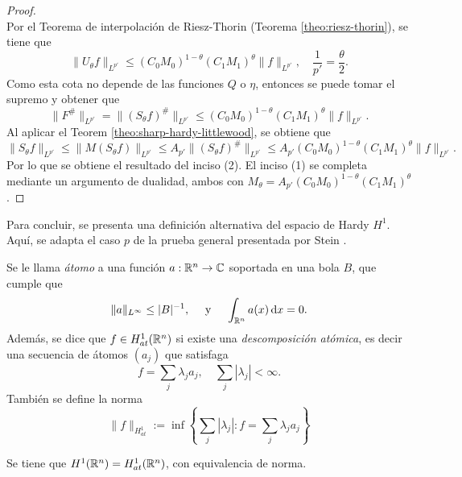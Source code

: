 \begin{proof}
\begin{equation*}
	\end{equation*}
	Por el Teorema de interpolación de Riesz-Thorin (Teorema \ref{theo:riesz-thorin}), se tiene que 
	\begin{equation*}
		\|U_\theta f\|_{L^{p'}} \leq (C_0M_0)^{1-\theta}(C_1M_1)^\theta \|f\|_{L^{p'}}, \quad \frac{1}{p'} = \frac{\theta}{2}.
	\end{equation*}
	Como esta cota no depende de las funciones $Q$ o $\eta$, entonces se puede tomar el supremo y obtener que 
	\begin{equation*}
		\|F^\#\|_{L^{p'}} =\| (S_\theta f)^\#\|_{L^{p'}} \leq (C_0M_0)^{1-\theta}(C_1M_1)^\theta \|f\|_{L^{p'}}.
	\end{equation*}
	Al aplicar el Teorem \ref{theo:sharp-hardy-littlewood}, se obtiene que 
	\begin{equation*}
		\|S_\theta f\|_{L^{p'}} \leq \|M(S_\theta f)\|_{L^{p'}} \leq A_{p'} \|(S_\theta f)^\#\|_{L^{p'}} \leq A_{p'} (C_0M_0)^{1-\theta}(C_1M_1)^\theta \|f\|_{L^{p'}}.
	\end{equation*}
	Por lo que se obtiene el resultado del inciso (2). El inciso (1) se completa mediante un argumento de dualidad, ambos con $M_\theta = A_{p'} (C_0M_0)^{1-\theta}(C_1M_1)^\theta$.
\end{proof}
Para concluir, se presenta una definición alternativa del espacio de Hardy $H^1$. Aquí, se adapta el caso $p$ de la prueba general presentada por Stein \cite{stein}.
\begin{definition}
	Se le llama \textit{átomo} a una función $a:\mathbb{R}^n\to\mathbb{C}$ soportada en una bola $B$, que cumple que 
	\begin{equation*}
		\|a\|_{L^\infty} \leq |B|^{-1}, \quad \text{ y } \quad \int_{\mathbb{R}^n} a(x) \mathop{}\!\mathrm{d} x = 0.
	\end{equation*}
	Además, se dice que $f\in H^1_{at}(\mathbb{R}^n)$ si existe una \textit{descomposición atómica}, es decir una secuencia de átomos $(a_j)$ que satisfaga
	\begin{equation*}
		f = \sum_j \lambda_j a_j, \quad \sum_j |\lambda_j| < \infty.
	\end{equation*}
	También se define la norma 
	\begin{equation*}
		\|f\|_{H^1_{at}} := \inf \left\{\sum_j |\lambda_j| : f=\sum_j\lambda_j a_j \right\}
	\end{equation*}
\end{definition}
\begin{theorem}
	Se tiene que $H^1(\mathbb{R}^n) = H^1_{at}(\mathbb{R}^n)$, con equivalencia de norma.
\end{theorem}
